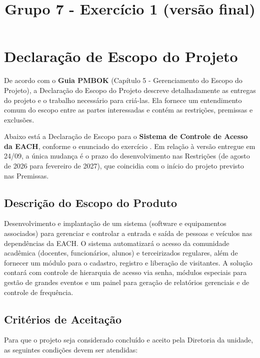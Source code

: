 \documentclass[a4paper]{article}
\title{\textbf{Grupo 7 - Exercício 1 (versão final)}}
\begin{document}
\capa

\section{Declaração de Escopo do Projeto}

De acordo com o \textbf{Guia PMBOK} (Capítulo 5 - Gerenciamento do Escopo do Projeto), a Declaração do Escopo do Projeto descreve detalhadamente as entregas do projeto e o trabalho necessário para criá-las. Ela fornece um entendimento comum do escopo entre as partes interessadas e contém as restrições, premissas e exclusões.

Abaixo está a Declaração de Escopo para o \textbf{Sistema de Controle de Acesso da EACH}, conforme o enunciado do exercício \cite{enunciado}. Em relação à versão entregue em 24/09, a única mudança é o prazo do desenvolvimento nas Restrições (de agosto de 2026 para fevereiro de 2027), que coincidia com o início do projeto previsto nas Premissas.

\subsection{Descrição do Escopo do Produto}

Desenvolvimento e implantação de um sistema (software e equipamentos associados) para gerenciar e controlar a entrada e saída de pessoas e veículos nas dependências da EACH. O sistema automatizará o acesso da comunidade acadêmica (docentes, funcionários, alunos) e terceirizados regulares, além de fornecer um módulo para o cadastro, registro e liberação de visitantes. A solução contará com controle de hierarquia de acesso via senha, módulos especiais para gestão de grandes eventos e um painel para geração de relatórios gerenciais e de controle de frequência.

\subsection{Critérios de Aceitação}

Para que o projeto seja considerado concluído e aceito pela Diretoria da unidade, as seguintes condições devem ser atendidas:
\end{document}
